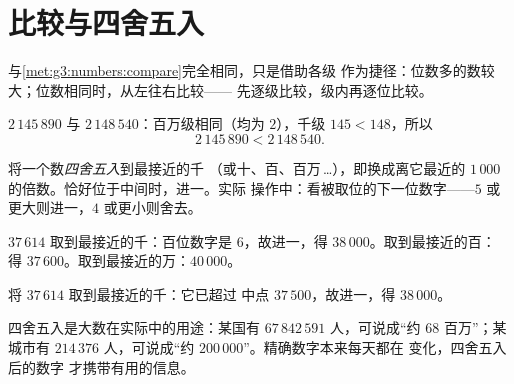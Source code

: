 \section{比较与四舍五入}

\begin{method}[比较大数]\label{met:g4:numbers:compare}
与\cref{met:g3:numbers:compare}完全相同，只是借助各级
作为捷径：位数多的数较大；位数相同时，从左往右比较——
先逐级比较，级内再逐位比较。
\end{method}

\begin{example}\label{ex:g4:numbers:compare}
$2\,145\,890$ 与 $2\,148\,540$：百万级相同（均为 $2$），千级
$145 < 148$，所以
\[
2\,145\,890 < 2\,148\,540 .
\]
\end{example}

\begin{definition}[四舍五入]\label{def:g4:numbers:round}
将一个数\emph{四舍五入}到最接近的千
（或十、百、百万\,\dots），即换成离它最近的
$1\,000$ 的倍数。恰好位于中间时，进一。实际
操作中：看被取位的下一位数字——$5$ 或
更大则进一，$4$ 或更小则舍去。
\end{definition}

\begin{example}\label{ex:g4:numbers:round}
$37\,614$ 取到最接近的千：百位数字是
$6$，故进一，得 $38\,000$。取到最接近的百：
得 $37\,600$。取到最接近的万：$40\,000$。
\end{example}

\begin{omfigure}

{\small 将 $37\,614$ 取到最接近的千：它已超过
中点 $37\,500$，故进一，得 $38\,000$。}
\end{omfigure}

\begin{example}[世界中的数量级]\label{ex:g4:numbers:world}
四舍五入是大数在实际中的用途：某国有
$67\,842\,591$ 人，可说成“约 $68$ 百万”；某城市有
$214\,376$ 人，可说成“约 $200\,000$”。精确数字本来每天都在
变化，四舍五入后的数字
才携带有用的信息。
\end{example}

